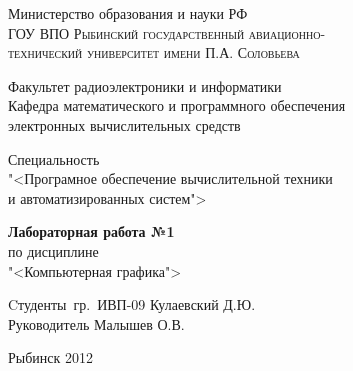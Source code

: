 	\begin{titlepage}
	\newpage
		\begin{center}
			Министерство образования и науки РФ\\
			\textsc{ГОУ ВПО Рыбинский государственный авиационно-\\
			технический университет имени П.А. Соловьева}
		\end{center}
		\vspace{1em}
		\begin{center}
			Факультет радиоэлектроники и информатики\\
			Кафедра математического и программного обеспечения\\
			электронных вычислительных средств\\
		\end{center}
		\begin{center}
			Специальность\\
			"<Програмное обеспечение вычислительной техники\\
			и автоматизированных систем">
		\end{center}
		\vspace{4cm}
		\begin{center}
			{\bfseries Лабораторная работа №1}\\
			по дисциплине\\
			"<Компьютерная графика">\\
		\end{center}
		\begin{flushleft}
			Cтуденты~гр.~ИВП-09 \hrulefill Кулаевский Д.Ю.\\
			Руководитель \hrulefill Малышев О.В.
		\end{flushleft}
		\vspace{\fill}
		\begin{center}
			Рыбинск 2012
		\end{center}
	\end{titlepage}
